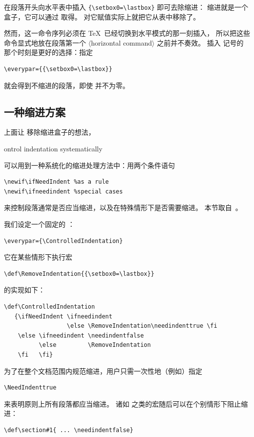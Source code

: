 \documentclass[a4paper]{rapport3}
\def\gr#1{$\langle$#1$\rangle$}\def\key#1{{\tt#1}}
\def\gram#1{\gr{#1}}%
\def\howto#1\par{}
\begin{document}
在段落开头向水平表中插入
\verb.{\setbox0=\lastbox}. 即可去除缩进：
缩进就是一个盒子，它可以通过  取得。
对它赋值实际上就把它从表中移除了。

然而，这一命令序列必须在 \TeX\ 已经切换到水平模式的那一刻插入，
所以把这些命令显式地放在段落第一个 \gram{horizontal command} 之前并不奏效。
插入  记号的那个时刻是更好的选择：指定
\begin{verbatim}
\everypar={{\setbox0=\lastbox}}
\end{verbatim}
就会得到不缩进的段落，即使  并不为零。 


\subsection{一种缩进方案}
\label{indent:scheme}

上面让  移除缩进盒子的想法，
\howto Control indentation systematically\par
可以用到一种系统化的缩进处理方法中：用两个条件语句
\begin{verbatim}
\newif\ifNeedIndent %as a rule
\newif\ifneedindent %special cases
\end{verbatim}
来控制段落通常是否应当缩进，以及在特殊情形下是否需要缩进。
本节取自~\cite{E3}。

我们设定一个固定的 ：
\begin{verbatim}
\everypar={\ControlledIndentation}
\end{verbatim}
它在某些情形下执行宏 
\begin{verbatim}
\def\RemoveIndentation{{\setbox0=\lastbox}}
\end{verbatim}
 的实现如下：\begin{verbatim}
\def\ControlledIndentation
   {\ifNeedIndent \ifneedindent 
                  \else \RemoveIndentation\needindenttrue \fi
    \else \ifneedindent \needindentfalse
          \else         \RemoveIndentation
    \fi   \fi}
\end{verbatim}
为了在整个文档范围内规范缩进，用户只需一次性地（例如）指定
\begin{verbatim}
\NeedIndenttrue
\end{verbatim}
来表明原则上所有段落都应当缩进。
诸如  之类的宏随后可以在个别情形下阻止缩进：
\begin{verbatim}
\def\section#1{ ... \needindentfalse}
\end{verbatim}
    
\end{document}
